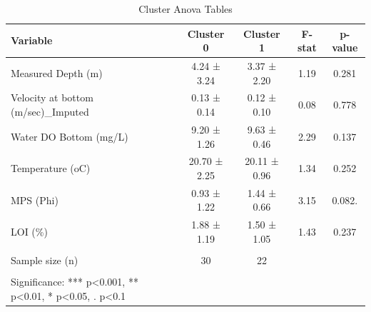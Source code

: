 
\begin{table}[htbp]
    \centering
    \small
    \caption{Cluster Anova Tables}
    \label{tab:cluster_anova_tables}
    \begin{tabular}{lcccc}
        \toprule
        Variable & Cluster 0 & Cluster 1 & F-stat & p-value \\
        \midrule
        Measured Depth (m) & 4.24 ± 3.24 & 3.37 ± 2.20 & 1.19 & 0.281 \\
        Velocity  at bottom (m/sec)\_Imputed & 0.13 ± 0.14 & 0.12 ± 0.10 & 0.08 & 0.778 \\
        Water DO Bottom (mg/L) & 9.20 ± 1.26 & 9.63 ± 0.46 & 2.29 & 0.137 \\
        Temperature (oC) & 20.70 ± 2.25 & 20.11 ± 0.96 & 1.34 & 0.252 \\
        MPS (Phi) & 0.93 ± 1.22 & 1.44 ± 0.66 & 3.15 & 0.082. \\
        LOI (\%) & 1.88 ± 1.19 & 1.50 ± 1.05 & 1.43 & 0.237 \\
         &  &  &  &  \\
        Sample size (n) & 30 & 22 &  &  \\
         &  &  &  &  \\
        Significance: *** p<0.001, ** p<0.01, * p<0.05, . p<0.1 &  &  &  &  \\
        \bottomrule
    \end{tabular}
\end{table}
